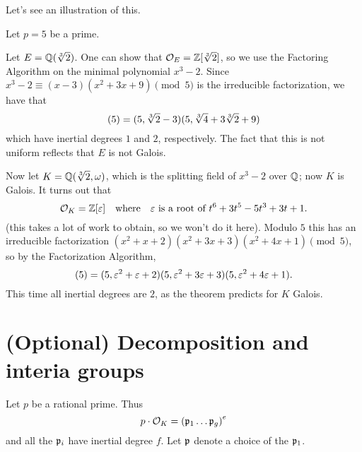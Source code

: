 Let's see an illustration of this.
\begin{example}
	Let $p = 5$ be a prime.
	\begin{enumerate}[(a)]
		\ii Let $E = \mathbb Q(\sqrt[3]{2})$.
		One can show that $\mathcal O_E = \mathbb Z[\sqrt[3]{2}]$, so 
		we use the Factoring Algorithm on the minimal polynomial $x^3-2$.
		Since $x^3-2 \equiv (x-3)(x^2+3x+9) \pmod 5$ is the irreducible factorization,
		we have that
		\[ (5) = (5,\sqrt[3]{2}-3)(5, \sqrt[3]{4}+3\sqrt[3]{2}+9) \]
		which have inertial degrees $1$ and $2$, respectively.
		The fact that this is not uniform reflects that $E$ is not Galois.

		\ii Now let $K = \mathbb Q(\sqrt[3]{2},\omega)$, which is the splitting
		field of $x^3-2$ over $\mathbb Q$; now $K$ is Galois.
		It turns out that
		\[ \mathcal O_K = \mathbb Z[\varepsilon] \quad\text{where}\quad \varepsilon \text { is a root of } t^6+3t^5-5t^3+3t+1. \]
		(this takes a lot of work to obtain, so we won't do it here).
		Modulo $5$ this has an irreducible factorization
		$(x^2+x+2)(x^2+3x+3)(x^2+4x+1) \pmod 5$,
		so by the Factorization Algorithm,
		\[ (5) = (5, \varepsilon^2+\varepsilon+2)(5, \varepsilon^2+3\varepsilon+3)(5, \varepsilon^2+4\varepsilon+1). \]
		This time all inertial degrees are $2$, as the theorem predicts for $K$ Galois.
	\end{enumerate}
\end{example}

\section{(Optional) Decomposition and interia groups}
Let $p$ be a rational prime.
Thus
\[ p \cdot \mathcal O_K = \left( \mathfrak p_1 \dots \mathfrak p_g \right)^e \]
and all the $\mathfrak p_i$ have inertial degree $f$.
Let $\mathfrak p$ denote a choice of the $\mathfrak p_1$.

